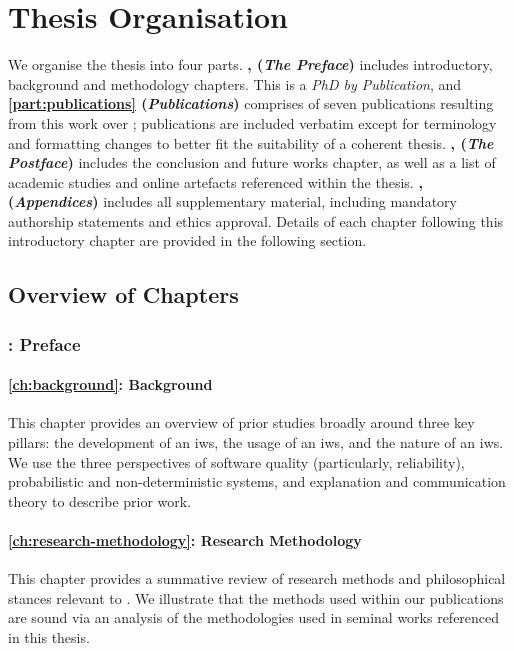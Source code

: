 \section{Thesis Organisation}
\label{sec:introduction:organisation}

We organise the thesis into four parts. \textbf{, (\textit{The Preface})} includes introductory, background and methodology chapters. This is a \textit{PhD by Publication}, and \textbf{\cref{part:publications} (\textit{Publications})} comprises of seven publications resulting from this work over ; publications are included verbatim except for terminology and formatting changes to better fit the suitability of a coherent thesis. \textbf{, (\textit{The Postface})} includes the conclusion and future works chapter, as well as a list of academic studies and online artefacts referenced within the thesis. \textbf{, (\textit{Appendices})} includes all supplementary material, including mandatory authorship statements and ethics approval. Details of each chapter following this introductory chapter are provided in the following section.

\subsection{Overview of Chapters}

\subsubsection{: Preface}


\paragraph{\cref{ch:background}: Background} This chapter provides an overview of prior studies broadly around three key pillars: the development of an \gls{iws}, the usage of an \gls{iws}, and the nature of an \gls{iws}. We use the three perspectives of software quality (particularly, reliability), probabilistic and non-deterministic systems, and explanation and communication theory to describe prior work.

\paragraph{\cref{ch:research-methodology}: Research Methodology} This chapter provides a summative review of research methods and philosophical stances relevant to . We illustrate that the methods used within our publications are sound via an analysis of the methodologies used in seminal works referenced in this thesis.

